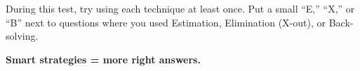 {\begin{tcolorbox}[
    enhanced,
    colback=funYellowLight,
    colframe=funYellow!60,
    arc=10pt,
    boxrule=1pt,
    left=6mm, right=6mm, top=4mm, bottom=4mm,
]
\vspace{2mm}

During this test, try using each technique at least once. Put a small ``E,'' ``X,'' or ``B'' next to questions where you used Estimation, Elimination (X-out), or Back-solving.
\end{tcolorbox}

\vspace{4mm}

\begin{center}
{\large\bfseries\color{funOrangeDark} \faWrench\hspace{2mm}Smart strategies = more right answers.\hspace{2mm}\faWrench}
\end{center}

}
\newpage
